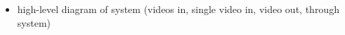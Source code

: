 \begin{itemize}
    \item high-level diagram of system (videos in, single video in, video out, through system)
\end{itemize}
